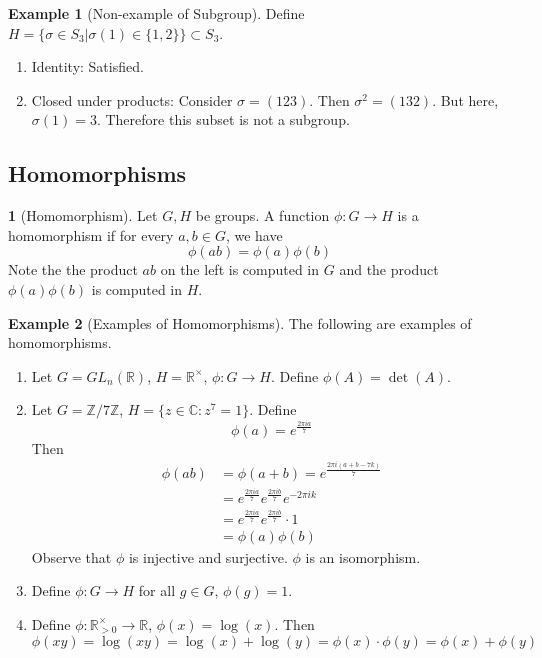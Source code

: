 \documentclass[12pt]{article}
\theoremstyle{definition}
\newtheorem{definition}{\color{NavyBlue}{\textbf{Definition}}}
\newcommand{\R}{\mathbb{R}}
\newtheorem{example}{\color{WildStrawberry}Example}
\theoremstyle{definition}
\begin{document}
\begin{example}[Non-example of Subgroup]
Define $H = \{ \sigma \in S_3 | \sigma(1) \in \{1, 2 \} \} \subset S_3$. 
\begin{enumerate}
	\item Identity: Satisfied.
	\item Closed under products: Consider $\sigma = (1 2 3)$. Then $\sigma^2 = (1 3 2)$. But here, $\sigma(1) = 3$. Therefore this subset is not a subgroup.
\end{enumerate}	
\end{example}

\subsection{Homomorphisms}
\begin{definition}[Homomorphism]
	Let $G, H$ be groups. A function $\phi : G \to H$ is a homomorphism if for every $a,b \in G$, we have 
	\begin{equation}
		\phi(ab) = \phi(a)\phi(b)
	\end{equation}
	Note the the product $ab$ on the left is computed in $G$ and the product $\phi(a)\phi(b)$ is computed in $H$.
\end{definition}

\begin{example}[Examples of Homomorphisms] The following are examples of homomorphisms.
\begin{enumerate}
	\item Let $G = GL_n(\mathbb{R})$, $H = \mathbb{R}^{\times}$, $\phi : G \to H$. Define $\phi(A) = \det(A)$.
	\item Let $G = \mathbb{Z} / 7 \mathbb{Z}$, $H = \{z \in \mathbb{C}: z^7 = 1\}$. Define
	\begin{equation}
		\phi(a) = e^{\frac{2\pi i a}{7}}
	\end{equation}
	Then
	\begin{align*}
		\phi(ab) &= \phi(a + b) = e^{\frac{2\pi i (a + b - 7k)}{7}} \\
		&= e^{\frac{2\pi i a}{7}} e^{\frac{2\pi i b}{7}} e^{-2\pi i k}  \\
		&= e^{\frac{2\pi i a}{7}} e^{\frac{2\pi i b}{7}} \cdot 1 \\
		&= \phi(a)\phi(b)
	\end{align*}
	Observe that $\phi$ is injective and surjective. $\phi$ is an isomorphism.
	\item Define $\phi : G \to H$ for all $g \in G$, $\phi(g) = 1$.
	\item Define $\phi : \R^{\times}_{> 0} \to \R$, $\phi(x) = \log(x)$. Then
	\begin{equation}
		\phi(xy) = \log(xy) = \log(x) + \log(y) = \phi(x) \cdot \phi(y) = \phi(x) + \phi(y)
	\end{equation}
\end{enumerate}
\end{example}
\end{document}
